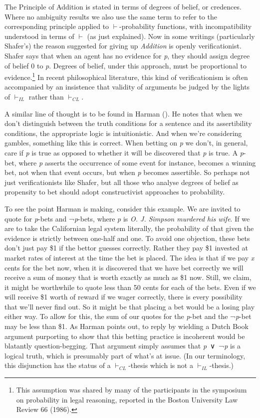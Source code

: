 \documentclass[
  11pt,
  letterpaper,
  DIV=11,
  numbers=noendperiod,
  twoside]{scrartcl}
\begin{document}
The Principle of Addition is stated in terms of degrees of belief, or
credences. Where no ambiguity results we also use the same term to refer
to the corresponding principle applied to \(\vdash\)-probability
functions, with incompatibility understood in terms of \(\vdash\) (as
just explained). Now in some writings (particularly Shafer's) the reason
suggested for giving up \emph{Addition} is openly verificationist.
Shafer says that when an agent has no evidence for \emph{p}, they should
assign degree of belief 0 to \emph{p}. Degrees of belief, under this
approach, must be proportional to evidence.\footnote{This assumption was
  shared by many of the participants in the symposium on probability in
  legal reasoning, reported in the Boston University Law Review 66
  (1986).} In recent philosophical literature, this kind of
verificationism is often accompanied by an insistence that validity of
arguments be judged by the lights of \(\vdash_{IL}\) rather than
\(\vdash_{CL}\).

A similar line of thought is to be found in Harman
(). He notes that when we don't
distinguish between the truth conditions for a sentence and its
assertibility conditions, the appropriate logic is intuitionistic. And
when we're considering gambles, something like this is correct. When
betting on \emph{p} we don't, in general, care if \emph{p} is true as
opposed to whether it will be discovered that \emph{p} is true. A
\emph{p}-bet, where \emph{p} asserts the occurrence of some event for
instance, becomes a winning bet, not when that event occurs, but when
\emph{p} becomes assertible. So perhaps not just verificationists like
Shafer, but all those who analyse degrees of belief as propensity to bet
should adopt constructivist approaches to probability.

To see the point Harman is making, consider this example. We are invited
to quote for \emph{p}-bets and ¬\emph{p}-bets, where \emph{p} is
\emph{O. J. Simpson murdered his wife}. If we are to take the
Californian legal system literally, the probability of that given the
evidence is strictly between one-half and one. To avoid one objection,
these bets don't just pay \$1 if the bettor guesses correctly. Rather
they pay \$1 invested at market rates of interest at the time the bet is
placed. The idea is that if we pay \emph{x} cents for the bet now, when
it is discovered that we have bet correctly we will receive a sum of
money that is worth exactly as much as \$1 now. Still, we claim, it
might be worthwhile to quote less than 50 cents for each of the bets.
Even if we will receive \$1 worth of reward if we wager correctly, there
is every possibility that we'll never find out. So it might be that
placing a bet would be a losing play either way. To allow for this, the
sum of our quotes for the \emph{p}-bet and the ¬\emph{p}-bet may be less
than \$1. As Harman points out, to reply by wielding a Dutch Book
argument purporting to show that this betting practice is incoherent
would be blatantly question-begging. That argument simply assumes that
\emph{p}~∨~¬\emph{p} is a logical truth, which is presumably part of
what's at issue. (In our terminology, this disjunction has the status of
a \(\vdash_{CL}\)-thesis which is not a \(\vdash_{IL}\)-thesis.)
\end{document}
